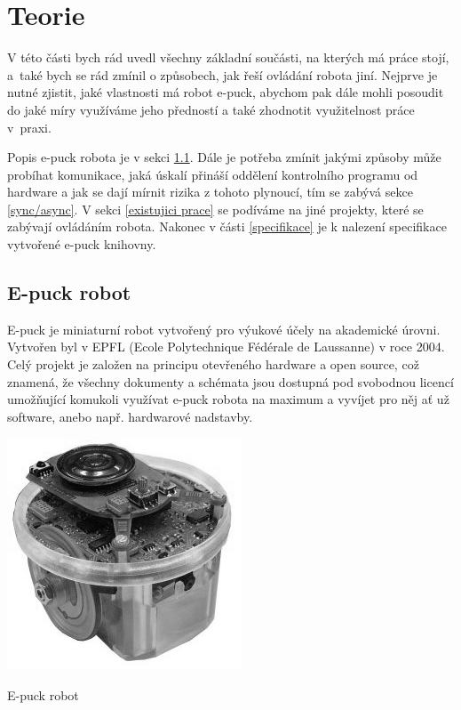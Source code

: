 \chapter{Teorie}
\label{chap:teorie}

    V této části bych rád uvedl všechny základní součásti, na kterých má práce
    stojí, a~také bych se rád zmínil o způsobech, jak řeší ovládání robota
    jiní. Nejprve je nutné zjistit, jaké vlastnosti má robot e-puck, abychom
    pak dále mohli posoudit do jaké míry využíváme jeho předností a také
    zhodnotit využitelnost práce v~praxi.

    Popis e-puck robota je v sekci \ref{e-puck robot}. Dále je potřeba zmínit
    jakými způsoby může probíhat komunikace, jaká úskalí přináší oddělení
    kontrolního programu od hardware a jak se dají mírnit rizika z tohoto
    plynoucí, tím se zabývá sekce \ref{sync/async}. V sekci \ref{existujici
    prace} se podíváme na jiné projekty, které se zabývají ovládáním robota.
    Nakonec v části \ref{specifikace} je k nalezení specifikace vytvořené
    e-puck knihovny.

    \section{E-puck robot}
    \label{e-puck robot}
    E-puck je miniaturní robot vytvořený pro výukové účely na akademické
    úrovni. Vytvořen byl v EPFL (Ecole Polytechnique Fédérale de Laussanne) v
    roce 2004. Celý projekt je založen na principu otevřeného hardware a open
    source, což znamená, že všechny dokumenty a schémata jsou dostupná pod
    svobodnou licencí umožňující komukoli využívat e-puck robota na maximum a
    vyvíjet pro něj ať už software, anebo např. hardwarové nadstavby.

    \renewcommand\listingscaption{Obrázek}
    \begin{listing}
        \begin{center}
            \includegraphics[scale=0.5]{e-puck.jpg}
            \caption{E-puck robot}
        \end{center}
    \end{listing}
    \renewcommand\listingscaption{Zdrojový kód}

